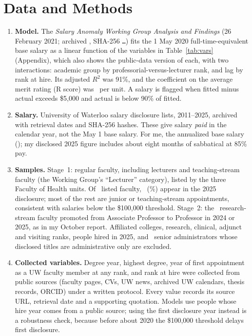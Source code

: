 \documentclass{article}
\begin{document}
\section*{Data and Methods}

\begin{enumerate}[leftmargin=*,itemsep=0em,topsep=0.2em]
    \item \textbf{Model.} The \emph{Salary Anomaly Working Group Analysis and Findings} (26 February 2021; archived \WGRetrieved, SHA-256 \texttt{\WGHash\ldots}) fits the 1 May 2020 full-time-equivalent base salary as a linear function of the variables in Table~\ref{tab:vars} (Appendix), which also shows the public-data version of each, with two interactions: academic group by professorial-versus-lecturer rank, and lag by rank at hire. Its adjusted $R^2$ was 91\%, and the coefficient on the average merit rating (R score) was \WGRCoef\ per unit. A salary is flagged when fitted minus actual exceeds \$5{,}000 and actual is below 90\% of fitted.
    \item \textbf{Salary.} University of Waterloo salary disclosure lists, 2011--2025, archived with retrieval dates and SHA-256 hashes. These give salary \emph{paid} in the calendar year, not the May 1 base salary. For me, the annualized base salary (\AnomSubjectBase); my disclosed 2025 figure includes about eight months of sabbatical at 85\% pay.
    \item \textbf{Samples.} Stage~1: regular faculty, including lecturers and teaching-stream faculty (the Working Group's ``Lecturer'' category), listed by the three Faculty of Health units. Of \HealthListed\ listed faculty, \HealthMatched\ (\HealthCoverage\%) appear in the 2025 disclosure; most of the rest are junior or teaching-stream appointments, consistent with salaries below the \$100{,}000 threshold. Stage~2: the \PoolInputs\ research-stream faculty promoted from Associate Professor to Professor in 2024 or 2025, as in my October report. Affiliated colleges, research, clinical, adjunct and visiting ranks, people hired in 2025, and \HealthExcludedAdmin\ senior administrators whose disclosed titles are administrative only are excluded.
    \item \textbf{Collected variables.} Degree year, highest degree, year of first appointment as a UW faculty member at any rank, and rank at hire were collected from public sources (faculty pages, CVs, UW news, archived UW calendars, thesis records, ORCID) under a written protocol. Every value records its source URL, retrieval date and a supporting quotation. Models use people whose hire year comes from a public source; using the first disclosure year instead is a robustness check, because before about 2020 the \$100{,}000 threshold delays first disclosure.

\end{enumerate}
\end{document}

